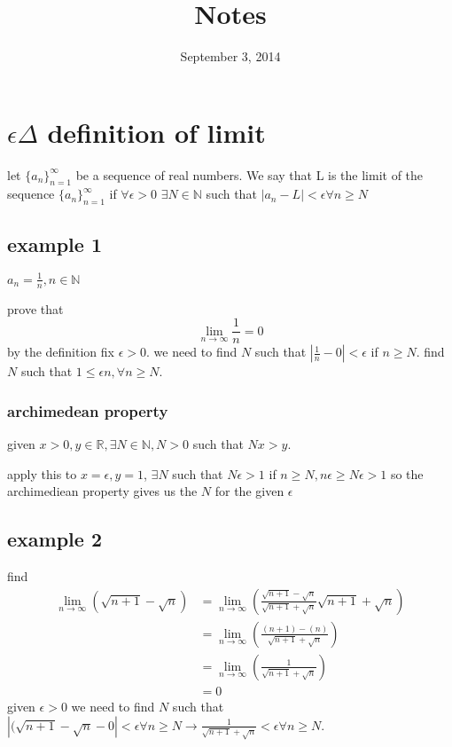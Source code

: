 \documentclass[letterpaper]{article}
\begin{document}
\title{Notes}
\date{September 3, 2014}
\maketitle
\section*{$\epsilon \Delta$ definition of limit}
let $\{a_n\}_{n=1}^{\infty}$ be a sequence of real numbers. We say that L is the limit of the sequence $\{a_n\}_{n=1}^{\infty}$ if $\forall\epsilon>0$ $\exists N\in\mathbb{N}$ such that $\left\lvert a_n-L\right\rvert < \epsilon \forall n\ge N$
\subsection*{example 1}
$a_n=\frac{1}{n},n\in\mathbb{N}$

prove that
\[\lim_{n\to\infty}\frac{1}{n}=0\]
by the definition
fix $\epsilon>0$. we need to find $N$ such that $\left\lvert \frac{1}{n}-0\right\rvert<\epsilon$  if $n\ge N$. find $N$ such that $1\le\epsilon n,\forall n\ge N$.

\subsubsection*{archimedean property}
given $x>0, y\in\mathbb{R}, \exists N\in\mathbb{N},N>0$ such that $Nx>y$.

apply this to $x=\epsilon, y=1$, $\exists N$ such that $N\epsilon>1$ if $n\ge N, n\epsilon\ge N\epsilon>1$ so the archimediean property gives us the $N$ for the given $\epsilon$

\subsection*{example 2}
find
\begin{align*}
\lim_{n\to\infty}\left(\sqrt{n+1}-\sqrt{n}\right)&=
\lim_{n\to\infty}\left(\frac{\sqrt{n+1}-\sqrt{n}}{\sqrt{n+1}+\sqrt{n}}\sqrt{n+1}+\sqrt{n}\right)\\
&=\lim_{n\to\infty}\left(\frac{(n+1)-(n)}{\sqrt{n+1}+\sqrt{n}}\right)\\
&=\lim_{n\to\infty}\left(\frac{1}{\sqrt{n+1}+\sqrt{n}}\right)\\
&=0
\end{align*}
given $\epsilon>0$ we need to find $N$ such that $\left\lvert (\sqrt{n+1}-\sqrt{n}-0\right\rvert<\epsilon\forall n\ge N\rightarrow\frac{1}{\sqrt{n+1}+\sqrt{n}}<\epsilon\forall n\ge N$.
\end{document}
